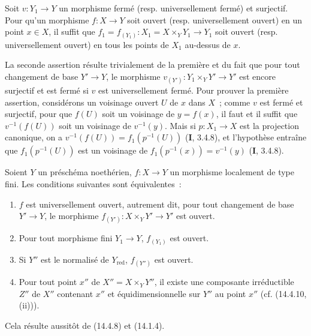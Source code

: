 \begin{lemma}[14.4.8.1]
\label{IV.14.4.8.1-fr}
Soit $v:Y_1\to Y$ un morphisme fermé \textup{(resp.} universellement fermé\textup{)} et surjectif.
Pour qu'un morphisme $f:X\to Y$ soit ouvert \textup{(resp.} universellement ouvert\textup{)} en un
point $x\in X$, il suffit que $f_1=f_{(Y_1)}:X_1=X\times_Y Y_1\to Y_1$ soit ouvert
\textup{(resp.} universellement ouvert\textup{)} en tous les points de $X_1$ au-dessus de $x$.
\end{lemma}

La seconde assertion résulte trivialement de la première et du fait que pour tout
changement de base $Y'\to Y$, le morphisme
$v_{(Y')}:Y_1\times_Y Y'\to Y'$ est encore surjectif et est fermé si $v$ est
universellement fermé. Pour prouver la première assertion, considérons
un voisinage ouvert $U$ de $x$ dans $X$~; comme $v$ est fermé et surjectif, pour
que $f(U)$ soit un voisinage de $y=f(x)$, il faut et il suffit que
$v^{-1}(f(U))$ soit un voisinage de $v^{-1}(y)$. Mais si $p:X_1\to X$ est la
projection canonique, on a $v^{-1}(f(U))=f_1(p^{-1}(U))$ (\textbf{I}, 3.4.8), et
l'hypothèse entraîne que $f_1(p^{-1}(U))$ est un voisinage de
$f_1(p^{-1}(x))=v^{-1}(y)$ (\textbf{I}, 3.4.8).

\begin{corollary}[14.4.9]
\label{IV.14.4.9-fr}
Soient $Y$ un préschéma noethérien, $f:X\to Y$ un morphisme localement de type
fini. Les conditions suivantes sont équivalentes~:
\begin{enumerate}[label=\emph{\alph*)}]
  \item $f$ est universellement ouvert, autrement dit, pour \textup{tout} changement de
  base $Y'\to Y$, le morphisme $f_{(Y')}:X\times_Y Y'\to Y'$ est ouvert.
  \item[\textup{a$'$)}] Pour tout morphisme \textup{fini} $Y_1\to Y$, $f_{(Y_1)}$ est ouvert.
  \item[\textup{a$''$)}] Si $Y''$ est le \textup{normalisé} de $Y_{\mathrm{red}}$, $f_{(Y'')}$ est
  ouvert.
  \item Pour tout point $x''$ de $X''=X\times_Y Y''$, il existe une composante
  irréductible $Z''$ de $X''$ contenant $x''$ et équidimensionnelle sur $Y''$ au
  point $x''$ \textup{(cf. (14.4.10, (ii)))}.
\end{enumerate}
\end{corollary}

Cela résulte aussitôt de (14.4.8) et (14.1.4).

